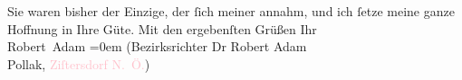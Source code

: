                     Sie waren bisher der Einzige, der ſich meiner annahm, und ich ſetze meine ganze
                    Hoffnung in Ihre Güte.\pend
           \pstart
           Mit den ergebenſten Grüßen\pend
           \pstart
           Ihr{\\[\baselineskip]}\spacefill\mbox{Robert Adam}\pend
           \leftskip=0em{}\pstart
           \noindent{}\raggedleft{}(Bezirksrichter Dr Robert Adam{\\}Pollak, \textcolor{pink}{Ziſtersdorf{ }\textsc{N. Ö.}}{}\ledrightnote{\textcolor{pink}{Zistersdorf}})\pend
           \endnumbering{}  
      
